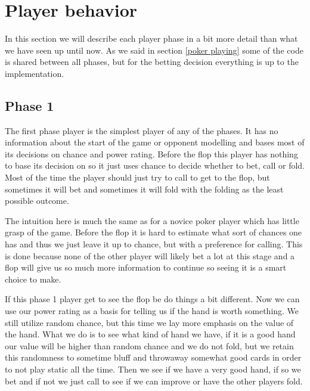 \documentclass[titlepage, a4paper]{article}
\begin{document}
\section{Player behavior}\label{player behavior}
In this section we will describe each player phase in a bit more detail than what
we have seen up until now. As we said in section \ref{poker playing} some of the
code is shared between all phases, but for the betting decision everything is
up to the implementation.

\subsection{Phase 1}\label{phase 1 player}
The first phase player is the simplest player of any of the phases. It has no 
information about the start of the game or opponent modelling and bases most
of its decisions on chance and power rating. Before the flop this player
has nothing to base its decision on so it just uses chance to decide whether
to bet, call or fold. Most of the time the player should just try to call to
get to the flop, but sometimes it will bet and sometimes it will fold with the folding
as the least possible outcome.

The intuition here is much the same as for a novice poker player which has little
grasp of the game. Before the flop it is hard to estimate what sort of chances
one has and thus we just leave it up to chance, but with a preference for calling.
This is done because none of the other player will likely bet a lot at this stage
and a flop will give us so much more information to continue so seeing it is a 
smart choice to make.

If this phase 1 player get to see the flop be do things a bit different. Now we
can use our power rating as a basis for telling us if the hand is worth something.
We still utilize random chance, but this time we lay more emphasis on the value
of the hand. What we do is to see what kind of hand we have, if it is a good hand
our value will be higher than random chance and we do not fold, but we retain this
randomness to sometime bluff and throwaway somewhat good cards in order to not
play static all the time. Then we see if we have a very good hand, if so we bet and
if not we just call to see if we can improve or have the other players fold.
\end{document}
